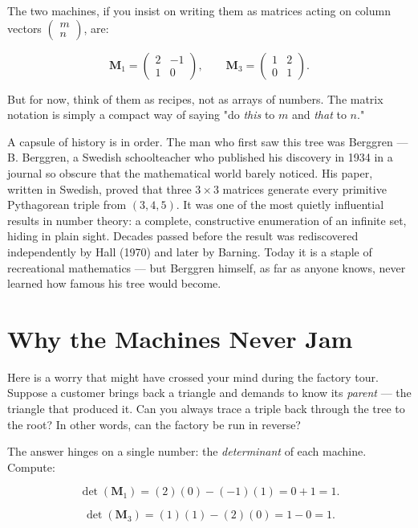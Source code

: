 The two machines, if you insist on writing them as matrices acting on column vectors $\begin{pmatrix} m \\ n \end{pmatrix}$, are:

\[
\mathbf{M}_1 = \begin{pmatrix} 2 & -1 \\ 1 & 0 \end{pmatrix}, \qquad
\mathbf{M}_3 = \begin{pmatrix} 1 & 2 \\ 0 & 1 \end{pmatrix}.
\]

But for now, think of them as recipes, not as arrays of numbers. The matrix notation is simply a compact way of saying "do \textit{this} to $m$ and \textit{that} to $n$."

A capsule of history is in order. The man who first saw this tree was Berggren --- B. Berggren, a Swedish schoolteacher who published his discovery in 1934 in a journal so obscure that the mathematical world barely noticed. His paper, written in Swedish, proved that three $3 \times 3$ matrices generate every primitive Pythagorean triple from $(3, 4, 5)$. It was one of the most quietly influential results in number theory: a complete, constructive enumeration of an infinite set, hiding in plain sight. Decades passed before the result was rediscovered independently by Hall (1970) and later by Barning. Today it is a staple of recreational mathematics --- but Berggren himself, as far as anyone knows, never learned how famous his tree would become.

\bigskip

\section*{Why the Machines Never Jam}

Here is a worry that might have crossed your mind during the factory tour. Suppose a customer brings back a triangle and demands to know its \textit{parent} --- the triangle that produced it. Can you always trace a triple back through the tree to the root? In other words, can the factory be run in reverse?

The answer hinges on a single number: the \textit{determinant} of each machine. Compute:

\[
\det(\mathbf{M}_1) = (2)(0) - (-1)(1) = 0 + 1 = 1.
\]

\[
\det(\mathbf{M}_3) = (1)(1) - (2)(0) = 1 - 0 = 1.
\]

